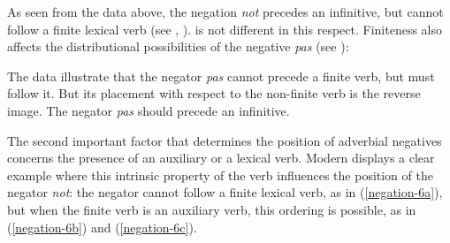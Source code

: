 \documentclass[output=paper
 	        ,biblatex
                ,babelshorthands
                ,newtxmath
                ,draftmode
                ,colorlinks, citecolor=brown
]{langscibook}
\begin{document}
\begin{exe}
\ex\label{negation-eng-fin-neg} \begin{xlist}
\zl


\begin{exe}
\ex\label{negation-fr-fin-neg} \begin{xlist}
\zl
%
\noindent As seen from the data above, the negation \textit{not} precedes an infinitive, but cannot follow
a finite lexical  verb (see \citealt[Chapter~15]{Baker:89}, \citealt{Baker:91,Ernst:92}).
 is not different in this respect. Finiteness also affects the distributional possibilities of the  negative \emph{pas} (see \citealt{AG:97, KS:02, Zeijlstra:15}):

\eal
{}
\zl

\eal{}
\zl

\noindent
The data illustrate that the negator \textit{pas} cannot precede a finite verb,
but must follow it. But its placement with respect to
the non-finite verb is the reverse image. The negator \textit{pas}
should precede an infinitive.

The second important factor that determines the position of adverbial
negatives concerns the presence of an auxiliary or a lexical  verb.
Modern  displays a clear example where this
intrinsic property of the verb influences the position of
the  negator \textit{not}: the negator cannot follow
a finite lexical  verb, as in (\ref{negation-6a}), but when the finite verb is an auxiliary verb,
this ordering is possible, as in (\ref{negation-6b}) and (\ref{negation-6c}).


\end{xlist}
\end{exe}
\end{xlist}
\end{exe}
\end{document}
